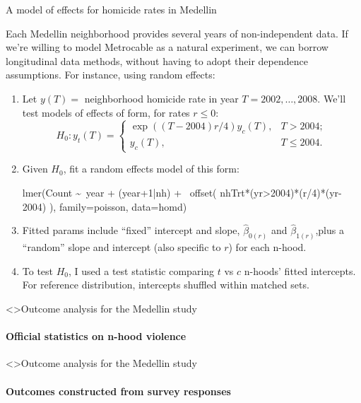 \begin{frame}[fragile]{A model of effects for homicide rates in Medellin}

Each Medellin neighborhood provides several years of non-independent
data.  If we're willing to model Metrocable as a natural experiment,
we can borrow longitudinal data methods, without having to adopt their
dependence assumptions.   For instance, using random
 effects: 

 \begin{enumerate}[<+->]
 \item Let
   $y(T)=$ neighborhood homicide rate in year $T=2002, \ldots, 2008$.  We'll test models of
   effects of form, for rates $r \leq 0$:
$$H_{0}: y_{t}(T) = \left\{ \begin{array}{lr}\exp((T-2004) r/4)
                              y_{c}(T),& T> 2004; \\
y_{c}(T),& T\leq 2004.\end{array} \right.$$ 
 \item Given $H_{0}$, fit a random effects model of this form:
\begin{semiverbatim}
 lmer(Count \textasciitilde\  year + (year+1|nh) +\ \pause
            \alert<@+| handout:0>{offset}( nhTrt*(yr>2004)*(r/4)*(yr-2004) ),
          family=poisson, data=homd)
\end{semiverbatim}
\item Fitted params include  ``fixed'' intercept and slope,
  $\hat{\beta}_{0(r)}$ and $ \hat{\beta}_{1(r)}$,\pause  plus a
  ``random'' slope and intercept (also specific to $r$) for
  each n-hood.  
\item To test $H_{0}$, I used a test statistic comparing $t$ vs $c$
  n-hoods' fitted intercepts. For reference distribution, 
  intercepts shuffled within matched sets.
 \end{enumerate}

  
\end{frame}

\begin{frame}<\nottheirhandout>{Outcome analysis for the Medellin study}
\framesubtitle{Official statistics on n-hood violence}
  
  \begin{center}
  \end{center}

\end{frame}



\begin{frame}<\nottheirhandout>{Outcome analysis for the Medellin
    study}
\framesubtitle{Outcomes constructed from survey responses}

\begin{center}
\end{center}
\end{frame}
